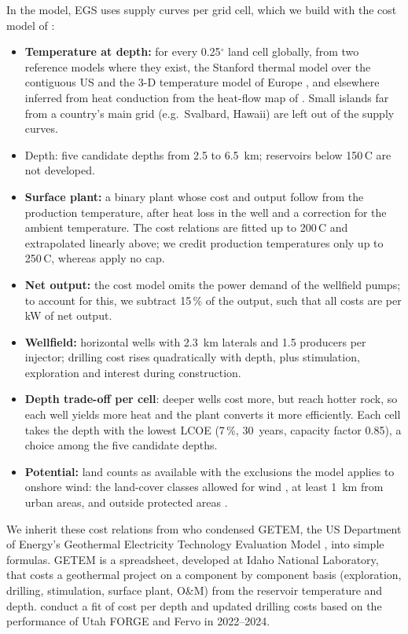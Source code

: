 In the model, EGS uses supply curves per grid cell, which we build with the cost model of \citet{ricks2025}:
\begin{itemize}[nosep,leftmargin=*]
\item \textbf{Temperature at depth:} for every 0.25$^\circ$ land cell globally, from two reference models where they exist, the Stanford thermal model over the contiguous US \citep{aljubran2024} and the 3-D temperature model of Europe \citep{limberger2014}, and elsewhere inferred from heat conduction from the heat-flow map of \citet{lucazeau2019}.
Small islands far from a country's main grid (e.g.\ Svalbard, Hawaii) are left out of the supply curves.
\item Depth: five candidate depths from 2.5 to 6.5~km; reservoirs below 150\,\textdegree C are not developed.
\item \textbf{Surface plant:} a binary plant whose cost and output follow from the production temperature, after heat loss in the well and a correction for the ambient temperature.
The cost relations are fitted up to 200\,\textdegree C and extrapolated linearly above; we credit production temperatures only up to 250\,\textdegree C, whereas \citet{ricks2025} apply no cap.
\item \textbf{Net output:} the cost model omits the power demand of the wellfield pumps; to account for this, we subtract 15\,\% of the output, such that all costs are per kW of net output.
\item \textbf{Wellfield:} horizontal wells with 2.3~km laterals and 1.5 producers per injector; drilling cost rises quadratically with depth, plus stimulation, exploration and interest during construction.
\item \textbf{Depth trade-off per cell}: deeper wells cost more, but reach hotter rock, so each well yields more heat and the plant converts it more efficiently.
Each cell takes the depth with the lowest LCOE (7\,\%, 30~years, capacity factor 0.85), a choice among the five candidate depths.
\item \textbf{Potential:} land counts as available with the exclusions the model applies to onshore wind: the land-cover classes allowed for wind \citep{buchhorn2020}, at least 1~km from urban areas, and outside protected areas \citep{sosa2020}.
\end{itemize}

We inherit these cost relations from \citet{ricks2025} who condensed GETEM, the US Department of Energy's Geothermal Electricity Technology Evaluation Model \citep{mines2016}, into simple formulas.
GETEM is a spreadsheet, developed at Idaho National Laboratory, that costs a geothermal project on a component by component basis (exploration, drilling, stimulation, surface plant, O\&M) from the reservoir temperature and depth.
\citet{ricks2025} conduct a fit of cost per depth and updated drilling costs based on the performance of Utah FORGE and Fervo in 2022--2024.

